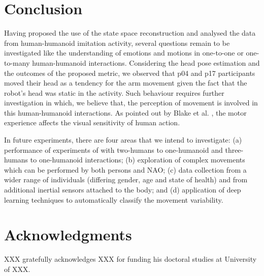 \documentclass{sigchi}
\begin{document}
\section{Conclusion}
Having proposed the use of the state space reconstruction and analysed the
data from human-humanoid imitation activity, several questions remain
to be investigated like the understanding of emotions and motions
in one-to-one or one-to-many human-humanoid interactions.
Considering the head pose estimation and the outcomes of the proposed metric,
we observed that p04 and p17 participants moved their head as a tendency for
the arm movement given the fact that the robot's head was static in the
activity.
Such behaviour requires further investigation in which, we believe that,
the perception of movement is involved in this human-humanoid interactions.
As pointed out by Blake et al. \cite{blake2007}, the motor experience affects
the visual sensitivity of human action.

In future experiments, there are four areas that we intend to investigate:
(a) performance of experiments of with two-humans to one-humanoid and
 three-humans to one-humanoid interactions;
(b) exploration of complex movements which can be performed by both persons and NAO;
(c) data collection from a wider range of individuals
(differing gender, age and state of health) and from additional inertial sensors
attached to the body; and
(d) application of deep learning techniques to automatically classify the
movement variability.




\section{Acknowledgments}

XXX gratefully acknowledges XXX for funding his doctoral studies at
University of XXX.

%
%
%
%
%


\balance{}



\end{document}
